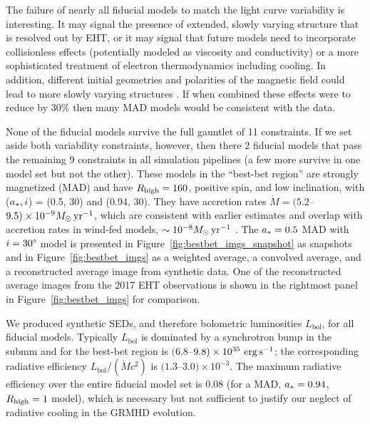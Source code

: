 The failure of nearly all fiducial models to match the light curve variability is interesting.
It may signal the presence of extended, slowly varying structure that is resolved out by EHT, or it may signal that future models need to incorporate collisionless effects (potentially modeled as viscosity and conductivity) or a more sophisticated treatment of electron thermodynamics including cooling. In addition, different initial geometries and polarities of the magnetic field could lead to more slowly varying structures \citep{2021arXiv211103689N}. If when combined these effects were to reduce  by 30\% then many MAD models would be consistent with the data.

None of the fiducial models survive the full gauntlet of 11 constraints.
If we set aside both variability constraints, however, then there 2 fiducial models that pass the remaining 9 constraints in all simulation pipelines (a few more survive in one model set but not the other).
These models in the ``best-bet region'' are strongly magnetized (MAD) and have $R_\mathrm{high} = 160$, positive spin, and low inclination, with ($a_*, i$) = (0.5, 30\degree) and (0.94, 30\degree).
They have accretion rates $\dot{M} = (5.2$--$9.5)\times 10^{-9}M_\odot\,\mathrm{yr}^{-1}$, which are consistent with earlier estimates and overlap with accretion rates in wind-fed models, $\sim 10^{-8} M_\odot\,\mathrm{yr}^{-1}$ \citep{2020ApJ...896L...6R}.
The $a_* = 0.5$ MAD with $i=30\degree$ model is presented in Figure~\ref{fig:bestbet_imgs_snapshot} as snapshots and in Figure~\ref{fig:bestbet_imgs} as a weighted average, a convolved average, and a reconstructed average image from synthetic data.
One of the reconstructed average images from the 2017 EHT observations is shown in the rightmost panel in Figure~\ref{fig:bestbet_imgs} for comparison.

We produced synthetic SEDs, and therefore bolometric luminosities $L_\mathrm{bol}$, for all fiducial models.
Typically $L_\mathrm{bol}$ is dominated by a synchrotron bump in the submm and for the best-bet region is $(6.8$--$9.8)\times10^{35}\,\,\mathrm{erg}\,\mathrm{s}^{-1}$; the corresponding radiative efficiency $L_\mathrm{bol}/(\dot{M} c^2)$ is $(1.3$--$3.0)\times 10^{-3}$.
The maximum radiative efficiency over the entire fiducial model set is 0.08 (for a MAD, $a_* = 0.94$, $R_\mathrm{high} = 1$ model), which is necessary but not sufficient to justify our neglect of radiative cooling in the GRMHD evolution.

